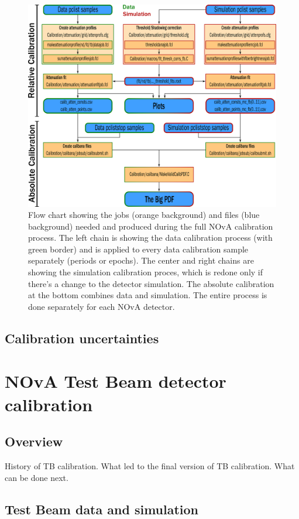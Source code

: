 \documentclass[12pt,a4paper]{article}
\begin{document}
\begin{figure}[hbtp]
\centering
\includegraphics[width=\textwidth]{Plots/CalibrationFlowChart.png}
\caption{Flow chart showing the jobs (orange background) and files (blue background) needed and produced during the full NOvA calibration process. The left chain is showing the data calibration process (with green border) and is applied to every data calibration sample separately (periods or epochs). The center and right chains are showing the simulation calibration proces, which is redone only if there's a change to the detector simulation. The absolute calibration at the bottom combines data and simulation. The entire process is done separately for each NOvA detector.} 
\end{figure}

\subsection{Calibration uncertainties}

\section{NOvA Test Beam detector calibration}
\subsection{Overview}
History of TB calibration. What led to the final version of TB calibration. What can be done next.

\subsection{Test Beam data and simulation}
\end{document}

